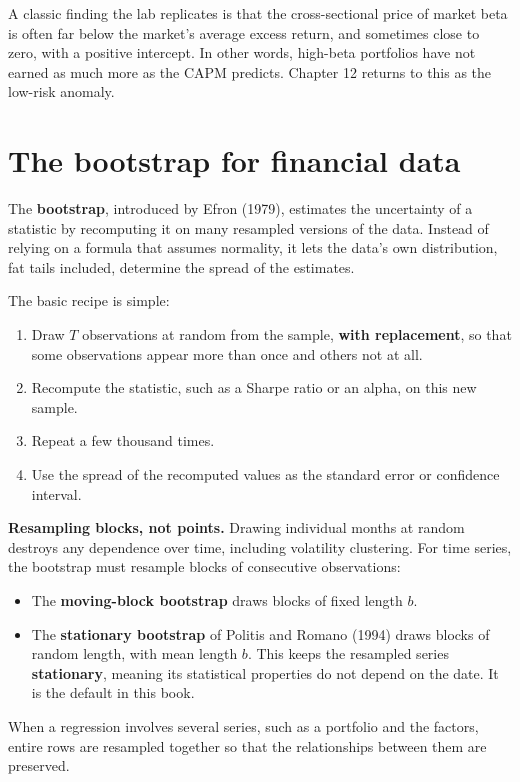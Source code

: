 A classic finding the lab replicates is that the cross-sectional price of market beta is often far below the market's average excess return, and sometimes close to zero, with a positive intercept. In other words, high-beta portfolios have not earned as much more as the CAPM predicts. Chapter 12 returns to this as the low-risk anomaly.

\section{The bootstrap for financial data}
\label{sec:03-bootstrap}

The \textbf{bootstrap}, introduced by Efron (1979), estimates the uncertainty of a statistic by recomputing it on many resampled versions of the data. Instead of relying on a formula that assumes normality, it lets the data's own distribution, fat tails included, determine the spread of the estimates.

The basic recipe is simple:

\begin{enumerate}
  \item Draw $T$ observations at random from the sample, \textbf{with replacement}, so that some observations appear more than once and others not at all.
  \item Recompute the statistic, such as a Sharpe ratio or an alpha, on this new sample.
  \item Repeat a few thousand times.
  \item Use the spread of the recomputed values as the standard error or confidence interval.
\end{enumerate}

\textbf{Resampling blocks, not points.} Drawing individual months at random destroys any dependence over time, including volatility clustering. For time series, the bootstrap must resample blocks of consecutive observations:

\begin{itemize}
  \item The \textbf{moving-block bootstrap} draws blocks of fixed length $b$.
  \item The \textbf{stationary bootstrap} of Politis and Romano (1994) draws blocks of random length, with mean length $b$. This keeps the resampled series \textbf{stationary}, meaning its statistical properties do not depend on the date. It is the default in this book.
\end{itemize}

When a regression involves several series, such as a portfolio and the factors, entire rows are resampled together so that the relationships between them are preserved.

